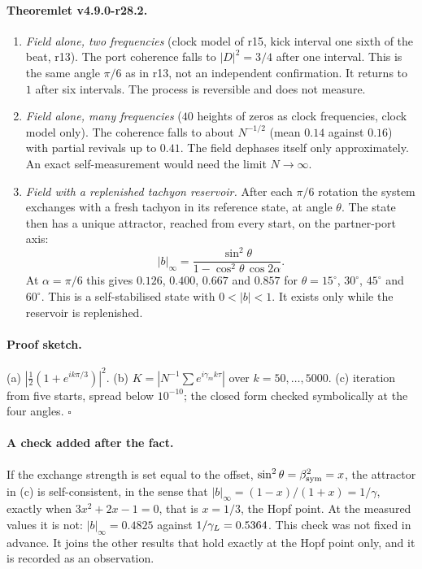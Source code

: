 \paragraph{Theoremlet v4.9.0-r28.2.}
\begin{enumerate}[leftmargin=2em]
\item[(a)] \emph{Field alone, two frequencies} (clock model of r15, kick interval one sixth of the beat, r13).  The port coherence falls
to \(|D|^2=3/4\) after one interval.  This is the same angle \(\pi/6\) as in r13, not an independent confirmation.  It returns to \(1\) after
six intervals.  The process is reversible and does not measure.
\item[(b)] \emph{Field alone, many frequencies} (\(40\) heights of zeros as clock frequencies, clock model only).  The coherence falls to
about \(N^{-1/2}\) (mean \(0.14\) against \(0.16\)) with partial revivals up to \(0.41\).  The field dephases itself only approximately.  An
exact self-measurement would need the limit \(N\to\infty\).
\item[(c)] \emph{Field with a replenished tachyon reservoir.}  After each \(\pi/6\) rotation the system exchanges with a fresh tachyon in its
reference state, at angle \(\theta\).  The state then has a unique attractor, reached from every start, on the partner-port axis:
\[
|b|_\infty=\frac{\sin^2\theta}{1-\cos^2\theta\,\cos2\alpha}.
\]
At \(\alpha=\pi/6\) this gives \(0.126\), \(0.400\), \(0.667\) and \(0.857\) for \(\theta=15^\circ\), \(30^\circ\), \(45^\circ\) and \(60^\circ\).  This is a self-stabilised state with \(0<|b|<1\).  It exists only while the reservoir is replenished.
\end{enumerate}

\paragraph{Proof sketch.}
(a) \(|\tfrac12(1+e^{ik\pi/3})|^2\).  (b) \(K=|N^{-1}\sum e^{i\gamma_mk\tau}|\) over \(k=50,\dots,5000\).  (c) iteration from five starts, spread below
\(10^{-10}\); the closed form checked symbolically at the four angles.  \(\square\)

\paragraph{A check added after the fact.}
If the exchange strength is set equal to the offset, \(\sin^2\theta=\beta_{\mathrm{sym}}^2=x\), the attractor in (c) is self-consistent, in the sense that
\(|b|_\infty=(1-x)/(1+x)=1/\gamma\), exactly when \(3x^2+2x-1=0\), that is \(x=1/3\), the Hopf point.  At the measured values it is not:
\(|b|_\infty=0.4825\) against \(1/\gamma_L=0.5364\).  This check was not fixed in advance.  It joins the other results that hold exactly at the
Hopf point only, and it is recorded as an observation.

